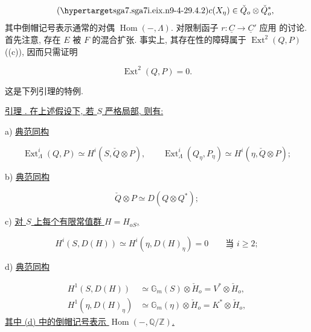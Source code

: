 \begin{equation}\tag{\SGARefTarget{sga7.sga7i.eix.n9-4-2}{9.4.2}}
c(X_\eta)\in\check Q_o\otimes\check Q_o^*,
\end{equation}
其中倒帽记号表示通常的对偶 $\operatorname{Hom}(-,\Lambda)$. 对限制函子 $r:\underline C\longrightarrow\underline C'$ 应用  的讨论. 首先注意, 存在 $E$ 被 $F$ 的混合扩张. 事实上, 其存在性的障碍属于 $\operatorname{Ext}^2(Q,P)$ ((c)), 因而只需证明

\begin{equation*}
\operatorname{Ext}^2(Q,P)=0.
\end{equation*}

这是下列引理的特例.

\medskip
\noindent
\underline{引理 . 在上述假设下, 若 $S$ 严格局部, 则有:}

\smallskip
\noindent
a) \underline{典范同构}

\begin{equation*}
\operatorname{Ext}^i_\Lambda(Q,P)\simeq
H^i(S,\check Q\otimes P),
\qquad
\operatorname{Ext}^i_\Lambda(Q_\eta,P_\eta)\simeq
H^i(\eta,\check Q\otimes P);
\end{equation*}

\noindent
b) \underline{典范同构}

\begin{equation}\tag{b)}
\check Q\otimes P\simeq D(Q\otimes Q^*);
\end{equation}

\noindent
c) \underline{对 $S$ 上每个有限常值群 $H=H_{oS}$,}

\begin{equation}\tag{c)}
H^i(S,D(H))\simeq H^i(\eta,D(H)_\eta)=0
\qquad\underline{\text{当 }}i\geq2;
\end{equation}

\noindent
d) \underline{典范同构}

\begin{equation}\tag{d)}
\begin{aligned}
H^1(S,D(H))&\simeq\mathbb G_m(S)\otimes\check H_o
              =V^*\otimes\check H_o,\\
H^1(\eta,D(H)_\eta)&\simeq\mathbb G_m(\eta)\otimes\check H_o
              =K^*\otimes\check H_o,
\end{aligned}
\end{equation}
\underline{其中 (d) 中的倒帽记号表示 $\operatorname{Hom}(-,\mathbb
Q/\mathbb Z)$.}

